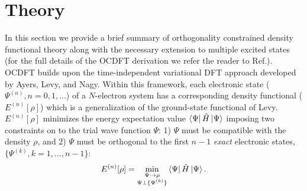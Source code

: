 \documentclass[12pt]{article}
\newcommand{\bra}[2][0]
{\ifthenelse{\equal{#1}{0}}{\left\langle #2 \right|}
{\ifthenelse{\equal{#1}{1}}{\big\langle #2 \big|}
{\ifthenelse{\equal{#1}{2}}{\Big\langle #2 \Big|}
{\ifthenelse{\equal{#1}{3}}{\bigg\langle #2 \bigg|}
{\ifthenelse{\equal{#1}{4}}{\Bigg\langle #2 \Bigg|}
{Error}}}}}
}
\newcommand{\ket}[2][0]
{\ifthenelse{\equal{#1}{0}}{\left| #2 \right\rangle}
{\ifthenelse{\equal{#1}{1}}{\big| #2 \big\rangle}
{\ifthenelse{\equal{#1}{2}}{\Big| #2 \Big\rangle}
{\ifthenelse{\equal{#1}{3}}{\bigg| #2 \bigg\rangle}
{\ifthenelse{\equal{#1}{4}}{\Bigg| #2 \Bigg\rangle}
{Error}}}}}
}
\begin{document}
\section{Theory}
In this section we provide a brief summary of orthogonality constrained density functional theory along with the necessary extension to multiple excited states (for the full details of the OCDFT derivation we refer the reader to Ref.).
OCDFT builds upon the time-independent variational DFT approach developed by Ayers, Levy, and Nagy.\cite{ayers_time-independent_2012}
Within this framework, each electronic state ($\Psi^{(n)}, n=0,1,\ldots$) of a $N$-electron system has a corresponding density functional ($E^{(n)}[\rho]$) which is a generalization of the ground-state functional of Levy.   $E^{(n)}[\rho]$ minimizes the energy expectation value $\bra{\Psi}\hat{H}\ket{\Psi}$ imposing two constraints on to the trial wave function $\Psi$: 1) $\Psi$ must be compatible with the density $\rho$, and 2) $\Psi$ must be orthogonal to the first $n-1$ \textit{exact} electronic states, $\{\Psi^{(k)}, k = 1,\ldots,n-1\}$:
\begin{equation}
E^{(n)}[\rho] = \min_{
\substack{
\Psi \rightarrow \rho\\
\Psi\bot \{\Psi^{(k)}\}
}
}
\bra{\Psi}\hat{H}\ket{\Psi}.
\end{equation}
\end{document}

